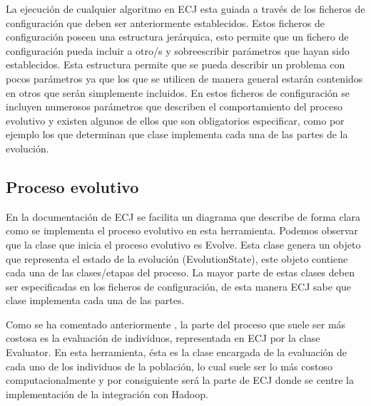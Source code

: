 
La ejecución de cualquier algoritmo en ECJ esta guiada a través de los ficheros de configuración que deben ser anteriormente establecidos. Estos ficheros de configuración poseen una estructura jerárquica, esto permite que un fichero de configuración pueda incluir a otro/s y sobreescribir parámetros que hayan sido establecidos. Esta estructura permite que se pueda describir un problema con pocos parámetros ya que los que se utilicen de manera general estarán contenidos en otros que ser\'an simplemente incluidos. En estos ficheros de configuración se incluyen numerosos parámetros que describen el comportamiento del proceso evolutivo y existen algunos de ellos que son obligatorios especificar, como por ejemplo los que determinan que clase implementa cada una de las partes de la evolución.

\subsection{Proceso evolutivo}

En la documentación de ECJ se facilita un diagrama  que describe de forma clara como se implementa el proceso evolutivo en esta herramienta. Podemos observar que la clase que inicia el proceso evolutivo es Evolve. Esta clase genera un objeto que representa el estado de la evoluci\'on (EvolutionState), este objeto contiene cada una de las clases/etapas del proceso. La mayor parte de estas clases deben ser especificadas en los ficheros de configuración, de esta manera ECJ sabe que clase implementa cada una de las partes.

Como se ha comentado anteriormente , la parte del proceso que suele ser m\'as costosa es la evaluación de individuos, representada  en ECJ por la clase Evaluator. En esta herramienta, \'esta es la clase encargada de la evaluación de cada uno de los individuos de la población, lo cual suele ser lo m\'as costoso computacionalmente y por consiguiente ser\'a la parte de ECJ donde se centre la implementación de la integración con Hadoop.